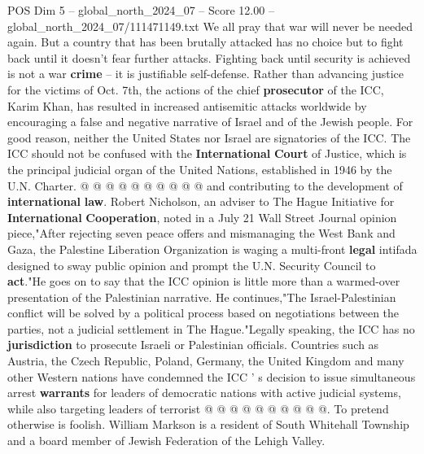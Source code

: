 \begin{textsample}{POS Dim 5 – global\_north\_2024\_07 – Score 12.00 – global\_north\_2024\_07/111471149.txt}
We all pray that war will never be needed again.
But a country that has been brutally attacked has no choice but to fight back until it doesn't fear further attacks.
Fighting back until security is achieved is not a war \textbf{crime} -- it is justifiable self-defense.
Rather than advancing justice for the victims of Oct. 7th, the actions of the chief \textbf{prosecutor} of the ICC, Karim Khan, has resulted in increased antisemitic attacks worldwide by encouraging a false and negative narrative of Israel and of the Jewish people.
For good reason, neither the United States nor Israel are signatories of the ICC.
The ICC should not be confused with the \textbf{International} \textbf{Court} of Justice, which is the principal judicial organ of the United Nations, established in 1946 by the U.N.
Charter. @ @ @ @ @ @ @ @ @ @ and contributing to the development of \textbf{international} \textbf{law}.
Robert Nicholson, an adviser to The Hague Initiative for \textbf{International} \textbf{Cooperation}, noted in a July 21 Wall Street Journal opinion piece,"After rejecting seven peace offers and mismanaging the West Bank and Gaza, the Palestine Liberation Organization is waging a multi-front \textbf{legal} intifada designed to sway public opinion and prompt the U.N.
Security Council to \textbf{act}."He goes on to say that the ICC opinion is little more than a warmed-over presentation of the Palestinian narrative.
He continues,"The Israel-Palestinian conflict will be solved by a political process based on negotiations between the parties, not a judicial settlement in The Hague."Legally speaking, the ICC has no \textbf{jurisdiction} to prosecute Israeli or Palestinian officials.
Countries such as Austria, the Czech Republic, Poland, Germany, the United Kingdom and many other Western nations have condemned the ICC ' s decision to issue simultaneous arrest \textbf{warrants} for leaders of democratic nations with active judicial systems, while also targeting leaders of terrorist @ @ @ @ @ @ @ @ @ @.
To pretend otherwise is foolish.
William Markson is a resident of South Whitehall Township and a board member of Jewish Federation of the Lehigh Valley.

\end{textsample}
